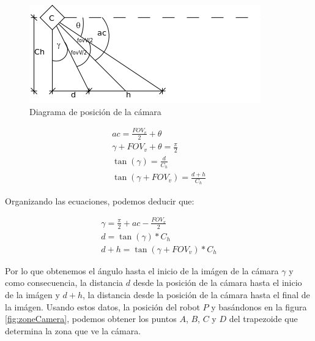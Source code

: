 \begin{figure}[htp]
\begin{center}
\includegraphics{comportamientos/figures/angleCamera.png}
\caption{Diagrama de posici\'on de la c\'amara}
\label{fig:angleCamera}
\end{center}
\end{figure}

\begin{eqnarray}
ac = \frac{FOV_v}{2} + \theta\\
\gamma + FOV_v + \theta = \frac{\pi}{2}\\
\tan(\gamma) = \frac{d}{C_h}\\
\tan(\gamma+FOV_v) = \frac{d+h}{C_h}
\end{eqnarray}

Organizando las ecuaciones, podemos deducir que:

\begin{eqnarray}
\gamma = \frac{\pi}{2} + ac - \frac{FOV_v}{2}\\
\label{eqn:distance_d}
d = \tan(\gamma) * C_h \\
\label{eqn:distance_dh}
d+h = \tan(\gamma+FOV_v) * C_h
\end{eqnarray}

Por lo que obtenemos el \'angulo hasta el inicio de la im\'agen de la c\'amara
$\gamma$ y como consecuencia, la distancia $d$ desde la posici\'on de la
c\'amara hasta el inicio de la im\'agen y $d+h$, la distancia desde la
posici\'on de la c\'amara hasta el final de la im\'agen. Usando estos datos,
la posici\'on del robot $P$ y bas\'andonos en la figura \ref{fig:zoneCamera},
podemos obtener los puntos $A$, $B$, $C$ y $D$ del trapezoide que determina la
zona que ve la c\'amara.

